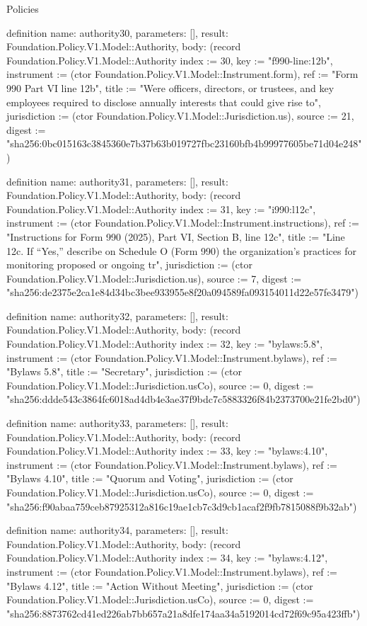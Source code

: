 \begin{lexlean}{Policies}
\begin{semanticmodule}
definition{
  name: authority30,
  parameters: [],
  result: Foundation.Policy.V1.Model::Authority,
  body: (record Foundation.Policy.V1.Model::Authority {index := 30, key := "f990-line:12b", instrument := (ctor Foundation.Policy.V1.Model::Instrument.form), ref := "Form 990 Part VI line 12b", title := "Were officers, directors, or trustees, and key employees required to disclose annually interests that could give rise to", jurisdiction := (ctor Foundation.Policy.V1.Model::Jurisdiction.us), source := 21, digest := "sha256:0bc015163c3845360e7b37b63b019727fbc23160bfb4b99977605be71d04e248"})
}

definition{
  name: authority31,
  parameters: [],
  result: Foundation.Policy.V1.Model::Authority,
  body: (record Foundation.Policy.V1.Model::Authority {index := 31, key := "i990:l12c", instrument := (ctor Foundation.Policy.V1.Model::Instrument.instructions), ref := "Instructions for Form 990 (2025), Part VI, Section B, line 12c", title := "Line 12c. If “Yes,” describe on Schedule O (Form 990) the organization’s practices for monitoring proposed or ongoing tr", jurisdiction := (ctor Foundation.Policy.V1.Model::Jurisdiction.us), source := 7, digest := "sha256:de2375e2ca1e84d34bc3bee933955e8f20a094589fa093154011d22e57fe3479"})
}

definition{
  name: authority32,
  parameters: [],
  result: Foundation.Policy.V1.Model::Authority,
  body: (record Foundation.Policy.V1.Model::Authority {index := 32, key := "bylaws:5.8", instrument := (ctor Foundation.Policy.V1.Model::Instrument.bylaws), ref := "Bylaws 5.8", title := "Secretary", jurisdiction := (ctor Foundation.Policy.V1.Model::Jurisdiction.usCo), source := 0, digest := "sha256:ddde543c3864fc6018ad4db4e3ae37f9bdc7c5883326f84b2373700e21fe2bd0"})
}

definition{
  name: authority33,
  parameters: [],
  result: Foundation.Policy.V1.Model::Authority,
  body: (record Foundation.Policy.V1.Model::Authority {index := 33, key := "bylaws:4.10", instrument := (ctor Foundation.Policy.V1.Model::Instrument.bylaws), ref := "Bylaws 4.10", title := "Quorum and Voting", jurisdiction := (ctor Foundation.Policy.V1.Model::Jurisdiction.usCo), source := 0, digest := "sha256:f90abaa759ceb87925312a816c19ae1cb7c3d9cb1acaf2f9fb7815088f9b32ab"})
}

definition{
  name: authority34,
  parameters: [],
  result: Foundation.Policy.V1.Model::Authority,
  body: (record Foundation.Policy.V1.Model::Authority {index := 34, key := "bylaws:4.12", instrument := (ctor Foundation.Policy.V1.Model::Instrument.bylaws), ref := "Bylaws 4.12", title := "Action Without Meeting", jurisdiction := (ctor Foundation.Policy.V1.Model::Jurisdiction.usCo), source := 0, digest := "sha256:8873762cd41ed226ab7bb657a21a8dfe174aa34a5192014cd72f69c95a423ffb"})
}


\end{semanticmodule}
\end{lexlean}
